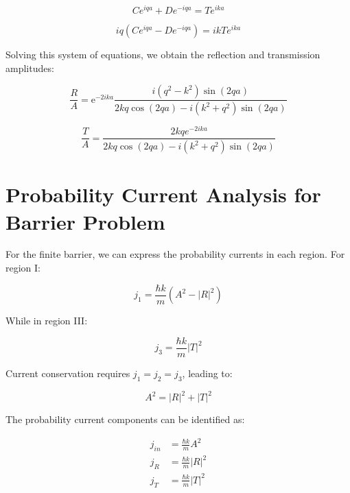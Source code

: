 \begin{equation}
C e^{i q a}+D e^{-i q a}=T e^{i k a}
\end{equation}

\begin{equation}
i q\left(C e^{i q a}-D e^{-i q a}\right)=i k T e^{i k a}
\end{equation}

Solving this system of equations, we obtain the reflection and transmission amplitudes:

\begin{equation}
\frac{R}{A}=\mathrm{e}^{-2 i k a} \frac{i\left(q^{2}-k^{2}\right) \sin (2 q a)}{2 k q \cos (2 q a)-i\left(k^{2}+q^{2}\right) \sin (2 q a)}
\end{equation}

\begin{equation}
\frac{T}{A}=\frac{2 k q e^{-2 i k a}}{2 k q \cos (2 q a)-i\left(k^{2}+q^{2}\right) \sin (2 q a)}
\end{equation}


\section{Probability Current Analysis for Barrier Problem}

For the finite barrier, we can express the probability currents in each region. For region I:

\begin{equation}
j_{1}=\frac{\hbar k}{m}\left(A^{2}-|R|^{2}\right)
\end{equation}

While in region III:

\begin{equation}
j_{3}=\frac{\hbar k}{m}|T|^{2}
\end{equation}

Current conservation requires $j_1 = j_2 = j_3$, leading to:

\begin{equation}
A^{2}=|R|^{2}+|T|^{2}
\end{equation}

The probability current components can be identified as:

\begin{align}
j_{i n} & =\frac{\hbar k}{m} A^{2} \\
j_{R} & =\frac{\hbar k}{m}|R|^{2}  \\
j_{T} & =\frac{\hbar k}{m}|T|^{2}
\end{align}

